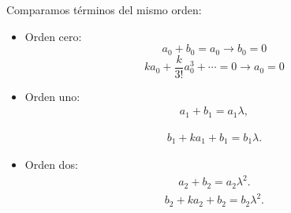\documentclass[11pt]{beamer}
\theoremstyle{definition}
\begin{document}
\begin{frame}
Comparamos t\'erminos del mismo orden:
\begin{itemize}
\item Orden cero:
\begin{equation}
a_{0}+b_{0}=a_{0} \rightarrow b_{0}=0
\end{equation}
\begin{equation}
k a_{0}+\frac{k}{3!}a_{0}^{3}+\cdots=0  \rightarrow a_{0}=0
\end{equation}
\item  Orden uno:
\begin{eqnarray}
a_{1}+b_{1}=a_{1}\lambda ,
\end{eqnarray}

\begin{eqnarray}
b_{1}+ka_{1}+b_{1}=b_{1}\lambda .
\end{eqnarray}
\item Orden dos:
\begin{eqnarray}
a_{2}+b_{2}=a_{2}\lambda^{2}.
\label{segundos_coeficientes_a}
\end{eqnarray}
\begin{eqnarray}
b_{2}+ka_{2}+b_{2}=b_{2}\lambda^{2}.
\label{segundos_coeficientes_b}
\end{eqnarray}
\end{itemize}

\end{frame}
\end{document}

